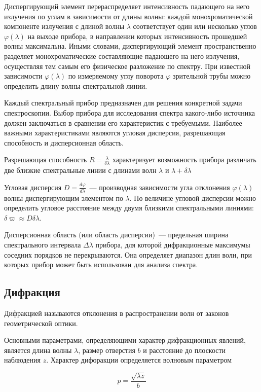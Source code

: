 Диспергирующий элемент перераспределяет интенсивность падающего на него излучения по углам в зависимости от длины волны: каждой монохроматической компоненте излучения с длиной волны $\lambda$ соответствует один или несколько углов $\varphi(\lambda)$ на выходе прибора, в направлении которых интенсивность прошедшей волны максимальна. Иными словами, диспергирующий элемент пространственно разделяет монохроматические составляющие падающего на него излучения, осуществляя тем самым его физическое разложение по спектру. При известной зависимости $\varphi(\lambda)$ по измеряемому углу поворота $\varphi$ зрительной трубы можно определить длину волны спектральной линии.

Каждый спектральный прибор предназначен для решения конкретной задачи спектроскопии. Выбор прибора для исследования спектра какого-либо источника должен заключаться в сравнении его характеристик с требуемыми. Наиболее важными характеристиками являются угловая дисперсия, разрешающая способность и дисперсионная область.

Разрешающая способность $R = \frac{\lambda}{\delta\lambda}$ характеризует возможность прибора различать две близкие спектральные линии с длинами волн $\lambda$ и $\lambda + \delta\lambda$

Угловая дисперсия $D = \frac{d\varphi}{d\lambda}$~--- производная зависимости угла отклонения $\varphi(\lambda)$ волны диспергирующим элементом по $\lambda$. По величине угловой дисперсии можно определить угловое расстояние между двумя близкими спектральными линиями: $\delta\varpi\approx D\delta\lambda$.

Дисперсионная область (или область дисперсии)~--- предельная ширина спектрального интервала $\Delta\lambda$ прибора, для которой дифракционные максимумы соседних порядков не перекрываются. Она определяет диапазон длин волн, при которых прибор может быть использован для анализа спектра.

\subsection{Дифракция}
Дифракцией называются отклонения в распространении волн от законов геометрической оптики.

Основными параметрами, определяющими характер дифракционных явлений, является длина волны $\lambda$, размер отверстия $b$ и расстояние до плоскости наблюдения $z$. Характер дифоракции определяется волновым параметром

\[
    p = \frac{\sqrt{\lambda z}}{b}
\]


